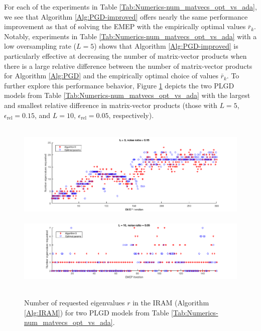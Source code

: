For each of the experiments in Table \ref{Tab:Numerics-num_matvecs_opt_vs_ada}, we see that Algorithm \ref{Alg:PGD-improved} offers nearly the same performance improvement as that of solving the EMEP with the empirically optimal values $\bar{r}_k$.
Notably, experiments in Table \ref{Tab:Numerics-num_matvecs_opt_vs_ada} with a low oversampling rate ($L=5$) shows that Algorithm \ref{Alg:PGD-improved} is particularly effective at decreasing the number of matrix-vector products when there is a large relative difference between the number of matrix-vector products for Algorithm \ref{Alg:PGD} and the empirically optimal choice of values $\bar{r}_k$.
To further explore this performance behavior, Figure \ref{Fig:Numerics-num_eigs_ada_vs_opt} depicts the two PLGD models from Table \ref{Tab:Numerics-num_matvecs_opt_vs_ada} with the largest and smallest relative difference in matrix-vector products (those with $L=5$, $\epsilon_\text{rel} = 0.15$, and $L=10$, $\epsilon_\text{rel} = 0.05$, respectively).




\begin{figure}[H]
\centering
\hbox{\hspace{-1.0cm} \includegraphics[scale=0.6]{Numerics-num_eigs_ada_vs_opt_1} }\vspace{0.6cm}
\hbox{\hspace{-1.0cm} \includegraphics[scale=0.6]{Numerics-num_eigs_ada_vs_opt_2} }
\vspace{0.2cm}
	\caption{
	Number of requested eigenvalues $r$ in the IRAM (Algorithm \ref{Alg:IRAM}) for two PLGD models from Table \ref{Tab:Numerics-num_matvecs_opt_vs_ada}.
	}
\label{Fig:Numerics-num_eigs_ada_vs_opt}
\end{figure}


